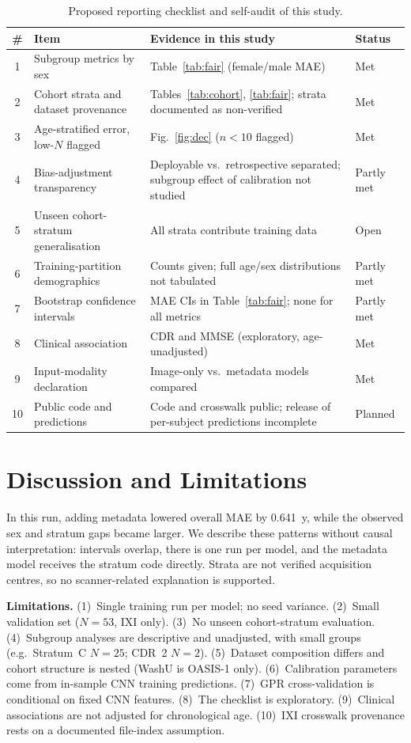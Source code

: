 \documentclass[runningheads]{llncs}
\begin{document}
\begin{table}[t]
\centering
\caption{Proposed reporting checklist and self-audit of this study.}
\label{tab:check}
\setlength{\tabcolsep}{3pt}
\begin{tabularx}{\textwidth}{c p{3.2cm} X l}
\toprule
\textbf{\#} & \textbf{Item} & \textbf{Evidence in this study} & \textbf{Status} \\
\midrule
1 & Subgroup metrics by sex & Table~\ref{tab:fair} (female/male MAE) & Met \\
2 & Cohort strata and dataset provenance & Tables~\ref{tab:cohort}, \ref{tab:fair}; strata documented as non-verified & Met \\
3 & Age-stratified error, low-$N$ flagged & Fig.~\ref{fig:dec} ($n<10$ flagged) & Met \\
4 & Bias-adjustment transparency & Deployable vs.\ retrospective separated; subgroup effect of calibration not studied & Partly met \\
5 & Unseen cohort-stratum generalisation & All strata contribute training data & Open \\
6 & Training-partition demographics & Counts given; full age/sex distributions not tabulated & Partly met \\
7 & Bootstrap confidence intervals & MAE CIs in Table~\ref{tab:fair}; none for all metrics & Partly met \\
8 & Clinical association & CDR and MMSE (exploratory, age-unadjusted) & Met \\
9 & Input-modality declaration & Image-only vs.\ metadata models compared & Met \\
10 & Public code and predictions & Code and crosswalk public; release of per-subject predictions incomplete & Planned \\
\bottomrule
\end{tabularx}
\end{table}

\section{Discussion and Limitations}
In this run, adding metadata lowered overall MAE by 0.641~y, while the observed sex and stratum gaps became larger. We describe these patterns without causal interpretation: intervals overlap, there is one run per model, and the metadata model receives the stratum code directly. Strata are not verified acquisition centres, so no scanner-related explanation is supported.

\textbf{Limitations.} (1)~Single training run per model; no seed variance. (2)~Small validation set ($N=53$, IXI only). (3)~No unseen cohort-stratum evaluation. (4)~Subgroup analyses are descriptive and unadjusted, with small groups (e.g.\ Stratum~C $N=25$; CDR~2 $N=2$). (5)~Dataset composition differs and cohort structure is nested (WashU is OASIS-1 only). (6)~Calibration parameters come from in-sample CNN training predictions. (7)~GPR cross-validation is conditional on fixed CNN features. (8)~The checklist is exploratory. (9)~Clinical associations are not adjusted for chronological age. (10)~IXI crosswalk provenance rests on a documented file-index assumption.
\end{document}
